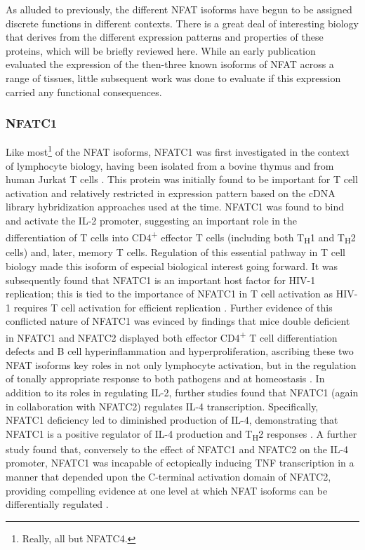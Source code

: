 As alluded to previously, the different NFAT isoforms have begun to be assigned discrete functions in different contexts. There is a great deal of interesting biology that derives from the different expression patterns and properties of these proteins, which will be briefly reviewed here. While an early publication \citep{Masuda1995} evaluated the expression of the then\hyp{}three known isoforms of NFAT across a range of tissues, little subsequent work was done to evaluate if this expression carried any functional consequences. 

\subsubsection{NFATC1}\label{nfatc1}

Like most\footnote{Really, all but NFATC4.} of the NFAT isoforms, NFATC1 was first investigated in the context of lymphocyte biology, having been isolated from a bovine thymus and from human Jurkat T cells \citep{Northrop1994}. This protein was initially found to be important for T cell activation and relatively restricted in expression pattern based on the cDNA library hybridization approaches used at the time. NFATC1 was found to bind and activate the IL\hyp{}2 promoter, suggesting an important role in the differentiation of T cells into CD4\textsuperscript{+} effector T cells (including both T\textsubscript{H}1 and T\textsubscript{H}2 cells) and, later, memory T cells. Regulation of this essential pathway in T cell biology made this isoform of especial biological interest going forward. It was subsequently found that NFATC1 is an important host factor for HIV\hyp{}1 replication; this is tied to the importance of NFATC1 in T cell activation as HIV\hyp{}1 requires T cell activation for efficient replication \citep{Kinoshita1997}. Further evidence of this conflicted nature of NFATC1 was evinced by findings that mice double deficient in NFATC1 and NFATC2 displayed both effector CD4\textsuperscript{+} T cell differentiation defects and B cell hyperinflammation and hyperproliferation, ascribing these two NFAT isoforms key roles in not only lymphocyte activation, but in the regulation of tonally appropriate response to both pathogens and at homeostasis \citep{Peng2001}. In addition to its roles in regulating IL\hyp{}2, further studies found that NFATC1 (again in collaboration with NFATC2) regulates IL\hyp{}4 transcription. Specifically, NFATC1 deficiency led to diminished production of IL\hyp{}4, demonstrating that NFATC1 is a positive regulator of IL\hyp{}4 production and T\textsubscript{H}2 responses \citep{Monticelli2002}. A further study found that, conversely to the effect of NFATC1 and NFATC2 on the IL\hyp{}4 promoter, NFATC1 was incapable of ectopically inducing TNF transcription in a manner that depended upon the C\hyp{}terminal activation domain of NFATC2, providing compelling evidence at one level at which NFAT isoforms can be differentially regulated \citep{Kaminuma2008}.

